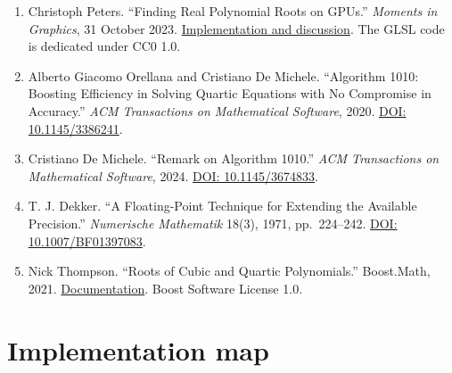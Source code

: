 \documentclass[11pt,a4paper]{article}
\begin{document}
\begin{enumerate}
  manifold handbook: basic geometry and computational aspects.''
  \emph{Advances in Computational Mathematics} 50, Article 6, 2024.
  \href{https://doi.org/10.1007/s10444-023-10090-8}{DOI:
  10.1007/s10444-023-10090-8}.
\item
  Christoph Peters. ``Finding Real Polynomial Roots on GPUs.''
  \emph{Moments in Graphics}, 31 October 2023.
  \href{https://momentsingraphics.de/GPUPolynomialRoots.html}{Implementation
  and discussion}. The GLSL code is dedicated under CC0 1.0.
\item
  Alberto Giacomo Orellana and Cristiano De Michele. ``Algorithm 1010:
  Boosting Efficiency in Solving Quartic Equations with No Compromise in
  Accuracy.'' \emph{ACM Transactions on Mathematical Software}, 2020.
  \href{https://doi.org/10.1145/3386241}{DOI: 10.1145/3386241}.
\item
  Cristiano De Michele. ``Remark on Algorithm 1010.'' \emph{ACM
  Transactions on Mathematical Software}, 2024.
  \href{https://doi.org/10.1145/3674833}{DOI: 10.1145/3674833}.
\item
  T. J. Dekker. ``A Floating-Point Technique for Extending the Available
  Precision.'' \emph{Numerische Mathematik} 18(3), 1971, pp.~224--242.
  \href{https://doi.org/10.1007/BF01397083}{DOI: 10.1007/BF01397083}.
\item
  Nick Thompson. ``Roots of Cubic and Quartic Polynomials.'' Boost.Math,
  2021.
  \href{https://www.boost.org/doc/libs/latest/libs/math/doc/html/math_toolkit/quartic_roots.html}{Documentation}.
  Boost Software License 1.0.
\end{enumerate}

\section*{Implementation map}\label{implementation-map}
\end{document}
